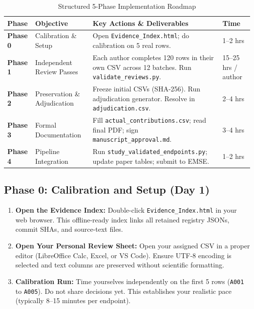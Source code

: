 \documentclass[11pt,a4paper]{article}
\begin{document}
\begin{table}[ht]
\centering
\small
\begin{tabularx}{\linewidth}{l p{3.2cm} X l}
\toprule
\textbf{Phase} & \textbf{Objective} & \textbf{Key Actions \& Deliverables} & \textbf{Time} \\
\midrule
\textbf{Phase 0} & Calibration \& Setup & Open \nolinkurl{Evidence_Index.html}; do calibration on 5 real rows. & 1--2 hrs \\
\addlinespace
\textbf{Phase 1} & Independent Review Passes & Each author completes 120 rows in their own CSV across 12 batches. Run \nolinkurl{validate_reviews.py}. & 15--25 hrs / author \\
\addlinespace
\textbf{Phase 2} & Preservation \& Adjudication & Freeze initial CSVs (SHA-256). Run adjudication generator. Resolve in \nolinkurl{adjudication.csv}. & 2--4 hrs \\
\addlinespace
\textbf{Phase 3} & Formal Documentation & Fill \nolinkurl{actual_contributions.csv}; read final PDF; sign \nolinkurl{manuscript_approval.md}. & 3--4 hrs \\
\addlinespace
\textbf{Phase 4} & Pipeline Integration & Run \nolinkurl{study_validated_endpoints.py}; update paper tables; submit to EMSE. & 1--2 hrs \\
\bottomrule
\end{tabularx}
\caption{Structured 5-Phase Implementation Roadmap}
\end{table}

\subsection{Phase 0: Calibration and Setup (Day 1)}
\begin{enumerate}
  \item \textbf{Open the Evidence Index:} Double-click \nolinkurl{Evidence_Index.html} in your web browser. This offline-ready index links all retained registry JSONs, commit SHAs, and source-text files.
  \item \textbf{Open Your Personal Review Sheet:} Open your assigned CSV in a proper editor (LibreOffice Calc, Excel, or VS Code). Ensure UTF-8 encoding is selected and text columns are preserved without scientific formatting.
  \item \textbf{Calibration Run:} Time yourselves independently on the first 5 rows (\nolinkurl{A001} to \nolinkurl{A005}). Do not share decisions yet. This establishes your realistic pace (typically 8--15 minutes per endpoint).
\end{enumerate}
\end{document}
